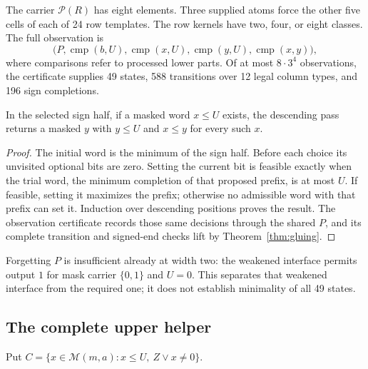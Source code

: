 The carrier $\mathcal P(R)$ has eight elements. Three supplied atoms force the other five cells of each of 24 row templates. The row kernels have two, four, or eight classes. The full observation is
\[
 \bigl(P,\operatorname{cmp}(b,U),\operatorname{cmp}(x,U),
          \operatorname{cmp}(y,U),\operatorname{cmp}(x,y)\bigr),
\]
where comparisons refer to processed lower parts. Of at most $8\cdot3^4$ observations, the certificate supplies 49 states, 588 transitions over 12 legal column types, and 196 sign completions.

\begin{proposition}\label{prop:descending}
In the selected sign half, if a masked word $x\le U$ exists, the descending pass returns a masked $y$ with $y\le U$ and $x\le y$ for every such $x$.
\end{proposition}
\begin{proof}
The initial word is the minimum of the sign half. Before each choice its unvisited optional bits are zero. Setting the current bit is feasible exactly when the trial word, the minimum completion of that proposed prefix, is at most $U$. If feasible, setting it maximizes the prefix; otherwise no admissible word with that prefix can set it. Induction over descending positions proves the result. The observation certificate records those same decisions through the shared $P$, and its complete transition and signed-end checks lift by Theorem~\ref{thm:gluing}.
\end{proof}

Forgetting $P$ is insufficient already at width two: the weakened interface permits output $1$ for mask carrier $\{0,1\}$ and $U=0$. This separates that weakened interface from the required one; it does not establish minimality of all 49 states.

\subsection{The complete upper helper}
Put $C=\{x\in\mathcal M(m,a):x\le U,\ Z\lor x\ne0\}$.

